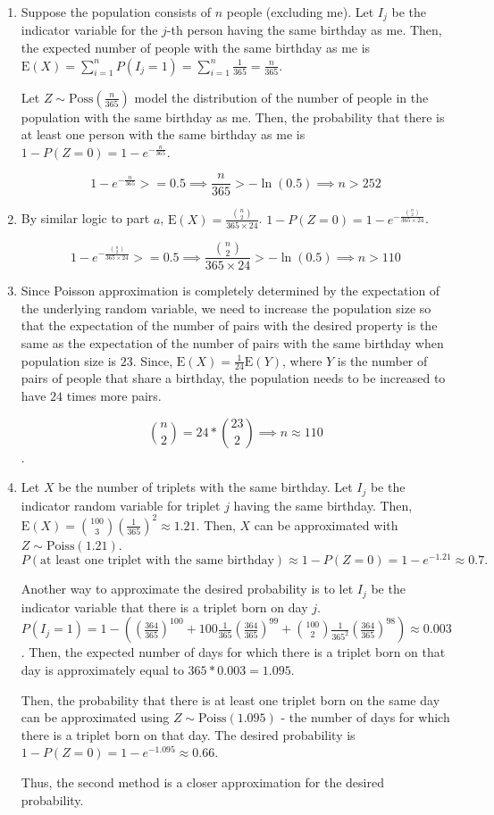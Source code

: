 \begin{enumerate}[label=(\alph*)]
\item Suppose the population consists of $n$ people (excluding me). Let $I_{j}$
be the indicator variable for the $j$-th person having the same birthday as me.
Then, the expected number of people with the same birthday as me is $\text{E}(X)
= \sum_{i=1}^{n}P(I_{j}=1) = \sum_{i=1}^{n}\frac{1}{365} = \frac{n}{365}$.

Let $Z \sim \text{Poss}(\frac{n}{365})$ model the distribution of the number of
people in the population with the same birthday as me. Then, the probability
that there is at least one person with the same birthday as me is $1 - P(Z=0) =
1 - e^{-\frac{n}{365}}$.

$$1 - e^{-\frac{n}{365}} >= 0.5 \implies \frac{n}{365} > -\ln(0.5) \implies n >
252$$

\item By similar logic to part $a$, $\text{E}(X) = \frac{\binom{n}{2}}{365
\times 24}$. $1
- P(Z=0) = 1 - e^{-\frac{\binom{n}{2}}{365 \times 24}}$.

$$1 - e^{-\frac{\binom{n}{2}}{365 \times 24}} >= 0.5 \implies \frac{\binom{n}
{2}}{365 \times 24} > -\ln(0.5) \implies n > 110$$

\item Since Poisson approximation is completely determined by the expectation of
the underlying random variable, we need to increase the population size so
that the expectation of the number of pairs
with the desired property is the same as the expectation of the number of pairs
with the same birthday when population size is $23$. Since, $\text{E}(X) = 
\frac{1}{24}\text{E}(Y)$, where $Y$ is the number of pairs of people that share a
birthday, the population needs to be increased to have $24$ times
more pairs.

$$\binom{n}{2}= 24 * \binom{23}{2} \implies n \approx 110$$.

\item Let $X$ be the number of triplets with the same birthday. Let $I_{j}$ be
the indicator random variable for triplet $j$ having the same birthday. Then,
$\text{E}(X) = \binom{100}{3}(\frac{1}{365})^{2} \approx 1.21$. Then, $X$ can
be approximated
with $Z \sim \text{Poiss}(1.21)$. $P(\text{at
least one triplet with the same birthday}) \approx 1 - P(Z=0) = 1 - e^{-1.21}
\approx
0.7.$

Another way to approximate the desired probability is to let $I_{j}$ be the
indicator variable that there is a triplet born on day $j$. $P(I_{j}=1) = 1 - ((
\frac{364}{365})^{100} + 100\frac{1}{365}(\frac{364}{365})^{99} + \binom{100}{2}
\frac{1}{365^{2}}(\frac{364}{365})^{98}) \approx 0.003$. Then, the expected
number of days for which there is a triplet born on that day is approximately
equal to $365 * 0.003 = 1.095$.

Then, the probability that there is at least one triplet born on the same day
can be approximated using $Z \sim \text{Poiss}(1.095)$ - the number of days for
which there is a triplet born on that day. The desired probability is $1 - P
(Z=0) = 1 - e^{-1.095} \approx 0.66$.

Thus, the second method is a closer approximation for the desired probability.
\end{enumerate}
